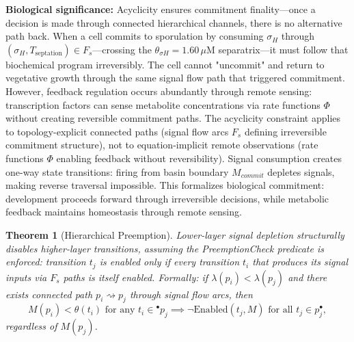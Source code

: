 \documentclass[10pt,letterpaper]{article}
\newtheorem{theorem}{Theorem}
\begin{document}
\textbf{Biological significance:} Acyclicity ensures commitment finality---once a decision is made through connected hierarchical channels, there is no alternative path back. When a cell commits to sporulation by consuming $\sigma_H$ through $(\sigma_H, T_{\text{septation}}) \in F_s$---crossing the $\theta_{\sigma H} = 1.60\,\mu$M separatrix---it must follow that biochemical program irreversibly. The cell cannot "uncommit" and return to vegetative growth through the same signal flow path that triggered commitment. However, feedback regulation occurs abundantly through remote sensing: transcription factors can sense metabolite concentrations via rate functions $\Phi$ without creating reversible commitment paths. The acyclicity constraint applies to topology-explicit connected paths (signal flow arcs $F_s$ defining irreversible commitment structure), not to equation-implicit remote observations (rate functions $\Phi$ enabling feedback without reversibility). Signal consumption creates one-way state transitions: firing from basin boundary $M_{commit}$ depletes signals, making reverse traversal impossible. This formalizes biological commitment: development proceeds forward through irreversible decisions, while metabolic feedback maintains homeostasis through remote sensing.

\begin{theorem}[Hierarchical Preemption]
Lower-layer signal depletion structurally disables higher-layer transitions,
assuming the PreemptionCheck predicate is enforced: transition $t_j$ is enabled
only if every transition $t_i$ that produces its signal inputs via $F_s$ paths
is itself enabled.
Formally: if $\lambda(p_i) < \lambda(p_j)$ and there exists connected path $p_i \rightsquigarrow p_j$ through signal flow arcs, then
\[
M(p_i) < \theta(t_i) \text{ for any } t_i \in {}^\bullet p_j \implies \neg\text{Enabled}(t_j, M) \text{ for all } t_j \in p_j^\bullet,
\]
regardless of $M(p_j)$.
\end{theorem}
\end{document}
